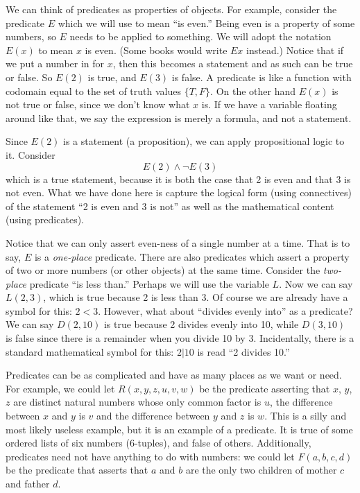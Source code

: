 \documentclass[12pt]{article}
\begin{document}
We can think of predicates as properties of objects.  For example, consider the predicate $E$ which we will use to mean ``is even.''  Being even is a property of some numbers, so $E$ needs to be applied to something.  We will adopt the notation $E(x)$ to mean $x$ is even.  (Some books would write $Ex$ instead.)  Notice that if we put a number in for $x$, then this becomes a statement and as such can be true or false.  So $E(2)$ is true, and $E(3)$ is false.  A predicate is like a function with codomain equal to the set of truth values $\{T, F\}$.  On the other hand $E(x)$ is not true or false, since we don't know what $x$ is.  If we have a variable floating around like that, we say the expression is merely a formula, and not a statement.

Since $E(2)$ is a statement (a proposition), we can apply propositional logic to it.  Consider 
\[E(2) \wedge \neg E(3)\]
which is a true statement, because it is both the case that 2 is even and that 3 is not even.  What we have done here is capture the logical form (using connectives) of the statement ``2 is even and 3 is not'' as well as the mathematical content (using predicates).

Notice that we can only assert even-ness of a single number at a time.  That is to say, $E$ is a {\em one-place} predicate.  There are also predicates which assert a property of two or more numbers (or other objects) at the same time.  Consider the {\em two-place} predicate ``is less than.''  Perhaps we will use the variable $L$.  Now we can say $L(2,3)$, which is true because 2 is less than 3.  Of course we are already have a symbol for this: $2 < 3$.  However, what about ``divides evenly into'' as a predicate?  We can say $D(2,10)$ is true because 2 divides evenly into 10, while $D(3, 10)$ is false since there is a remainder when you divide 10 by 3.  Incidentally, there is a standard mathematical symbol for this: $2 | 10$ is read ``2 divides 10.''  

Predicates can be as complicated and have as many places as we want or need.  For example, we could let $R(x,y,z,u,v,w)$ be the predicate asserting that $x$, $y$, $z$ are distinct natural numbers whose only common factor is $u$, the difference between $x$ and $y$ is $v$ and the difference between $y$ and $z$ is $w$.  This is a silly and most likely useless example, but it is an example of a predicate.  It is true of some ordered lists of six numbers (6-tuples), and false of others.  Additionally, predicates need not have anything to do with numbers: we could let $F(a,b,c,d)$ be the predicate that asserts that $a$ and $b$ are the only two children of mother $c$ and father $d$.
\end{document}
